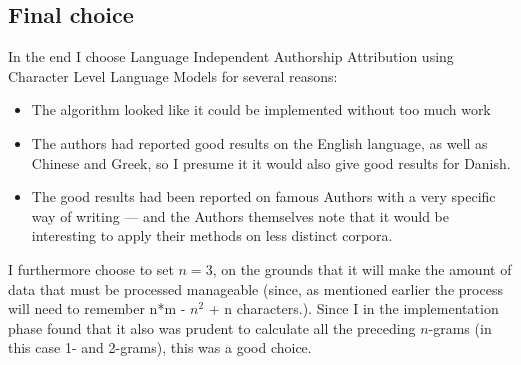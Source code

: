 \subsection{Final choice}

In the end I choose Language Independent Authorship Attribution using Character Level Language Models for several reasons:
\begin{itemize}
\item The algorithm looked like it could be implemented without too much work
\item The authors had reported good results on the English language, as well as Chinese and Greek, so I presume it it would also give good results for Danish.
\item The good results had been reported on famous Authors with a very specific way of writing --- and the Authors themselves note that it would be interesting to apply their methods on less distinct corpora. 
\end{itemize}

I furthermore choose to set $n = 3$, on the grounds that it will make the amount of data that must be processed manageable (since, as mentioned earlier the process will need to remember n*m - $n^2$ + n characters.). Since I in the implementation phase found that it also was prudent to calculate all the preceding $n$-grams (in this case 1- and 2-grams), this was a good choice.
